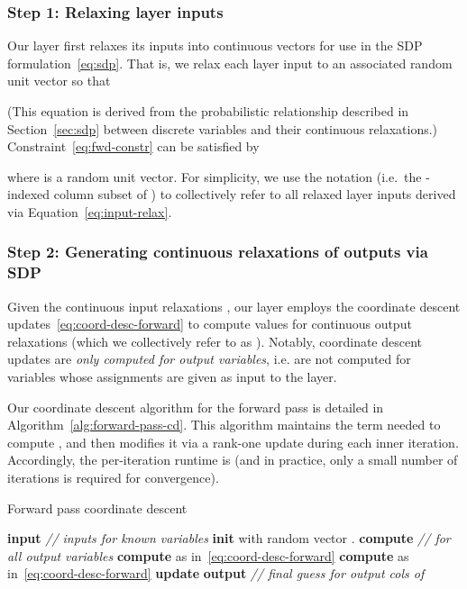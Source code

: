 \documentclass{article}
\begin{document}
	\subsubsection{Step 1: Relaxing layer inputs}
	\label{sec:input-relax}
	Our layer first relaxes its inputs  into continuous vectors for use in the SDP formulation~\eqref{eq:sdp}.
	That is, we relax each layer input  to an associated 
	random unit vector  so that
        
        (This equation is derived from the probabilistic relationship described in Section~\ref{sec:sdp} between discrete variables and their continuous relaxations.)
Constraint~\eqref{eq:fwd-constr} can be satisfied by 

        where  is a random unit vector.
	For simplicity, we use the notation  (i.e.~the -indexed column subset of ) to collectively refer to all relaxed layer inputs derived via Equation~\eqref{eq:input-relax}.
	
	\subsubsection{Step 2: Generating continuous relaxations of outputs via SDP}
	\label{sec:sdp-fwd}
	
	Given the continuous input relaxations 
	,
our layer employs the coordinate descent updates~\eqref{eq:coord-desc-forward} to compute values for continuous output relaxations  (which we collectively refer to as ).
Notably, coordinate descent updates are \emph{only computed for output variables}, i.e. are not computed for variables whose assignments are given as input to the layer.
	
	


	Our coordinate descent algorithm for the forward pass is detailed in Algorithm~\ref{alg:forward-pass-cd}.
	This algorithm maintains the term  needed to compute , and then modifies it via a rank-one update during each inner iteration.
	Accordingly, the per-iteration runtime is  (and in practice, only a small number of iterations is required for convergence).
	
	\begin{algorithm}[t]
		\begin{algorithmic}[1]
			\caption{Forward pass coordinate descent}
			\State \textbf{input}  \hspace{3.5em} \emph{// inputs for known variables}
			\State \textbf{init}  with random vector .
			\State \textbf{compute} 
			\For{} \hspace{1em} \emph{// for all output variables}
			\State \textbf{compute}  as in~\eqref{eq:coord-desc-forward}
			\State \textbf{compute}  as in~\eqref{eq:coord-desc-forward}
\State \textbf{update} 
			\EndFor
			\EndWhile
			\State \textbf{output}  \hspace{3.5em} \emph{// final guess for output cols of }
			\label{alg:forward-pass-cd}
		\end{algorithmic}
	\end{algorithm}
	
\end{document}
